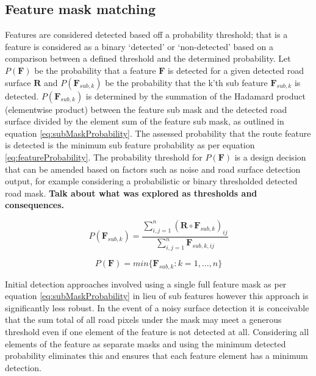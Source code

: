 \documentclass[]{aiaa-tc}%
\begin{document}
\subsection{Feature mask matching} 

Features are considered detected based off a probability threshold; that is a feature is considered as a binary `detected' or `non-detected' based on a comparison between a defined threshold and the determined probability. Let $P(\textbf{F})$ be the probability that a feature $\textbf{F}$ is detected for a given detected road surface $\textbf{R}$ and $P(\textbf{F}_{sub,k})$ be the probability that the k'th sub feature $\textbf{F}_{sub,k}$ is detected. $P(\textbf{F}_{sub,k})$ is determined by the summation of the Hadamard product (elementwise product) between the feature sub mask and the detected road surface divided by the element sum of the feature sub mask, as outlined in equation \ref{eq:subMaskProbability}. The assessed probability that the route feature is detected is the minimum sub feature probability as per equation \ref{eq:featureProbability}. The probability threshold for $P(\textbf{F})$ is a design decision that can be amended based on factors such as noise and road surface detection output, for example considering a probabilistic or binary thresholded detected road mask. \textbf{Talk about what was explored as thresholds and consequences.}

\begin{equation}\label{eq:subMaskProbability}
	P(\textbf{F}_{sub,k}) = \frac{\sum_{i,j=1}^{n} (\textbf{R} \circ \textbf{F}_{sub,k})_{ij}}{\sum_{i,j=1}^{n} \textbf{F}_{sub,k,ij}}
\end{equation}

\begin{equation}\label{eq:featureProbability}
	P(\textbf{F}) = min\{\textbf{F}_{sub,k}:k=1,...,n\}
\end{equation}

Initial detection approaches involved using a single full feature mask as per equation \ref{eq:subMaskProbability} in lieu of sub features however this approach is significantly less robust. In the event of a noisy surface detection it is conceivable that the sum total of all road pixels under the mask may meet a generous threshold even if one element of the feature is not detected at all. Considering all elements of the feature as separate masks and using the minimum detected probability eliminates this and ensures that each feature element has a minimum detection. 
\end{document}

